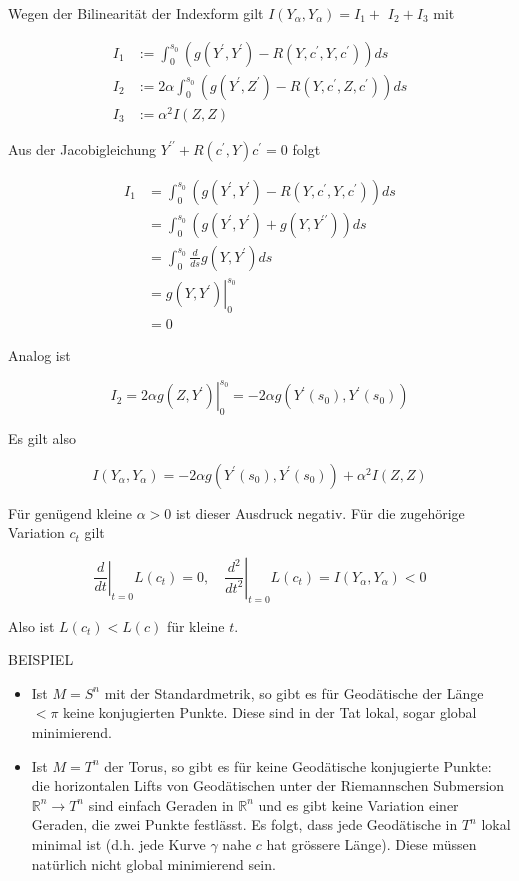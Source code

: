 \documentclass[10pt]{article}
\begin{document}
Wegen der Bilinearität der Indexform gilt $I\left(Y_{\alpha}, Y_{\alpha}\right)=I_{1}+$ $I_{2}+I_{3}$ mit

$$
\begin{aligned}
I_{1} & :=\int_{0}^{s_{0}}\left(g\left(Y^{\prime}, Y^{\prime}\right)-R\left(Y, c^{\prime}, Y, c^{\prime}\right)\right) d s \\
I_{2} & :=2 \alpha \int_{0}^{s_{0}}\left(g\left(Y^{\prime}, Z^{\prime}\right)-R\left(Y, c^{\prime}, Z, c^{\prime}\right)\right) d s \\
I_{3} & :=\alpha^{2} I(Z, Z)
\end{aligned}
$$

Aus der Jacobigleichung $Y^{\prime \prime}+R\left(c^{\prime}, Y\right) c^{\prime}=0$ folgt

$$
\begin{aligned}
I_{1} & =\int_{0}^{s_{0}}\left(g\left(Y^{\prime}, Y^{\prime}\right)-R\left(Y, c^{\prime}, Y, c^{\prime}\right)\right) d s \\
& =\int_{0}^{s_{0}}\left(g\left(Y^{\prime}, Y^{\prime}\right)+g\left(Y, Y^{\prime \prime}\right)\right) d s \\
& =\int_{0}^{s_{0}} \frac{d}{d s} g\left(Y, Y^{\prime}\right) d s \\
& =\left.g\left(Y, Y^{\prime}\right)\right|_{0} ^{s_{0}} \\
& =0
\end{aligned}
$$

Analog ist

$$
I_{2}=\left.2 \alpha g\left(Z, Y^{\prime}\right)\right|_{0} ^{s_{0}}=-2 \alpha g\left(Y^{\prime}\left(s_{0}\right), Y^{\prime}\left(s_{0}\right)\right)
$$

Es gilt also

$$
I\left(Y_{\alpha}, Y_{\alpha}\right)=-2 \alpha g\left(Y^{\prime}\left(s_{0}\right), Y^{\prime}\left(s_{0}\right)\right)+\alpha^{2} I(Z, Z)
$$

Für genügend kleine $\alpha>0$ ist dieser Ausdruck negativ. Für die zugehörige Variation $c_{t}$ gilt

$$
\left.\frac{d}{d t}\right|_{t=0} L\left(c_{t}\right)=0,\left.\quad \frac{d^{2}}{d t^{2}}\right|_{t=0} L\left(c_{t}\right)=I\left(Y_{\alpha}, Y_{\alpha}\right)<0
$$

Also ist $L\left(c_{t}\right)<L(c)$ für kleine $t$.

BEISPIEL

\begin{itemize}
  \item Ist $M=S^{n}$ mit der Standardmetrik, so gibt es für Geodätische der Länge $<\pi$ keine konjugierten Punkte. Diese sind in der Tat lokal, sogar global minimierend.
  \item Ist $M=T^{n}$ der Torus, so gibt es für keine Geodätische konjugierte Punkte: die horizontalen Lifts von Geodätischen unter der Riemannschen Submersion $\mathbb{R}^{n} \rightarrow T^{n}$ sind einfach Geraden in $\mathbb{R}^{n}$ und es gibt keine Variation einer Geraden, die zwei Punkte festlässt. Es folgt, dass jede Geodätische in $T^{n}$ lokal minimal ist (d.h. jede Kurve $\gamma$ nahe $c$ hat grössere Länge). Diese müssen natürlich nicht global minimierend sein.
\end{itemize}
\end{document}
